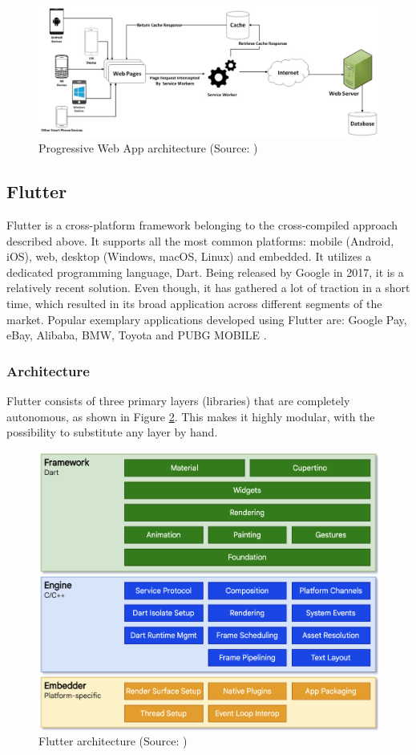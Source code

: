 \begin{figure}[h]
	\centering
	\includegraphics[width=\textwidth]{img/pwa}
	\caption{Progressive Web App architecture (Source: \cite{dawning_pwa})}
	\label{fig:pwa_architecture}
\end{figure}

\subsection{Flutter}
Flutter is a cross-platform framework belonging to the cross-compiled approach described above. It supports all the most common platforms: mobile (Android, iOS), web, desktop (Windows, macOS, Linux) and embedded. It utilizes a dedicated programming language, Dart. Being released by Google in 2017, it is a relatively recent solution. Even though, it has gathered a lot of traction in a short time, which resulted in its broad application across different segments of the market. Popular exemplary applications developed using Flutter are: Google Pay, eBay, Alibaba, BMW, Toyota and PUBG MOBILE \cite{flutter_showcase,flutter_docs_architecture}.

\subsubsection*{Architecture}

Flutter consists of three primary layers (libraries) that are completely autonomous, as shown in Figure \ref{fig:flutter_architecture}. This makes it highly modular, with the possibility to substitute any layer by hand.

\begin{figure}[h]
    \centering
    \includegraphics[width=.77\textwidth]{img/flutter_architecture}
    \caption{Flutter architecture (Source: \cite{flutter_docs_architecture})}
    \label{fig:flutter_architecture}
\end{figure}

